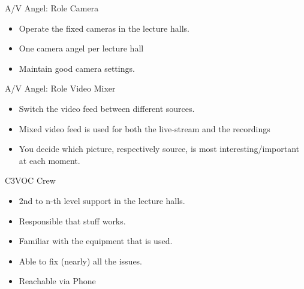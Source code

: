 \documentclass[aspectratio=169]{beamer}
\begin{document}
\begin{frame}{A/V Angel: Role Camera}
	\begin{itemize}
		\item Operate the fixed cameras in the lecture halls. 
		\item One camera angel per lecture hall 
		\item Maintain good camera settings.
	\end{itemize}
\end{frame}

\begin{frame}{A/V Angel: Role Video Mixer}
	\begin{itemize}
		\item Switch the video feed between different sources. 
		\item Mixed video feed is used for both the live-stream and the recordings 
		\item You decide which picture, respectively source, is most interesting/important at each moment.
	\end{itemize}
\end{frame}



\begin{frame}{C3VOC Crew}
	\begin{itemize}
		\item 2nd to n-th level support in the lecture halls. 
		\item Responsible that stuff works.
		\item Familiar with the equipment that is used. 
		\item Able to fix (nearly) all the issues. 
		\item Reachable via Phone
	\end{itemize}
\end{frame}

\end{document}
